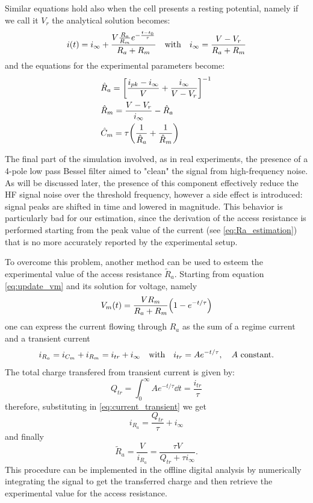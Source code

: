 \documentclass[a4paper]{article}
\begin{document}
Similar equations hold also when the cell presents a resting potential, namely if we call it $V_r$ the analytical solution becomes: 
\begin{equation}
    i(t) = i_\infty + \frac{V \frac{R_a}{R_m} e^{-\frac{t-t_0}{\tau}}}{R_a+R_m}\qq{with} i_\infty= \frac{V-V_r}{R_a+R_m}
\end{equation}
and the equations for the experimental parameters become:
\begin{align}
&\hat{R}_a = \bqty{\frac{i_{pk}-i_\infty}{V} + \frac{i_\infty}{V-V_r}}^{-1}\\
&\hat{R}_m = \frac{V-V_r}{i_\infty} - \hat{R}_a\\
&\hat{C}_m = \tau\pqty{\frac{1}{\hat{R}_a}+\frac{1}{\hat{R}_m}}
\end{align}


The final part of the simulation involved, as in real experiments, the presence of a 4-pole low pass Bessel filter aimed to "clean" the signal from high-frequency noise.
As will be discussed later, the presence of this component effectively reduce the HF signal noise over the threshold frequency, however a side effect is introduced: signal peaks are shifted in time and lowered in magnitude.
This behavior is particularly bad for our estimation, since the derivation of the access resistance is performed starting from the peak value of the current (see \eqref{eq:Ra_estimation}) that is no more accurately reported by the experimental setup.

To overcome this problem, another method can be used to esteem the experimental value of the access resistance $\tilde{R}_a.$
Starting from equation \eqref{eq:update_vm} and its solution for voltage, namely
\begin{equation}
    V_m(t) = \frac{V R_m}{R_a+R_m} \pqty{1-e^{-t/\tau}}
\end{equation}
one can express the current flowing through $R_a$ as the sum of a regime current and a transient current
\begin{equation}
    i_{R_a} = i_{C_m} + i_{R_m} = i_{tr}+ i_\infty \qq{with} i_{tr} = Ae^{-t/\tau}, \quad A \text{ constant.}
    \label{eq:current_transient}
\end{equation}
The total charge transfered from transient current is given by:
\begin{equation}
    Q_{tr} = \int_0^\infty Ae^{-t/\tau}\dd{t} = \frac{i_{tr}}{\tau}
\end{equation}
therefore, substituting in \eqref{eq:current_transient} we get
\begin{equation}
    i_{R_a} = \frac{Q_{tr}}{\tau} + i_\infty
\end{equation}
and finally
\begin{equation}
    \tilde{R}_a = \frac{V}{i_{R_a}} = \frac{\tau V}{Q_{tr} + \tau i_\infty}.
\end{equation}
This procedure can be implemented in the offline digital analysis by numerically integrating the signal to get the transferred charge and then retrieve the experimental value for the access resistance.
\end{document}
